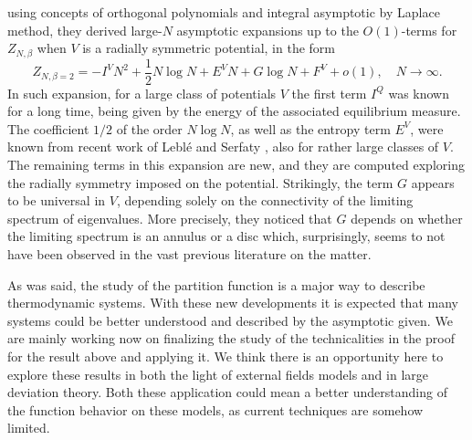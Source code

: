 \documentclass[12pt]{report}
\begin{document}
using concepts of orthogonal polynomials and integral asymptotic by Laplace method, they derived large-$N$ asymptotic expansions up to the $O(1)$-terms for  $Z_{N,\beta}$ when $V$ is a radially symmetric potential, in the form
%
$$
Z_{N,\beta=2}=-I^VN^2+\frac{1}{2}N\log N+E^V N+G\log N+F^V + o(1),\quad N\to \infty.
$$
%
In such expansion, for a large class of potentials $V$ the first term $I^Q$ was known for a long time, being given by the energy of the associated equilibrium measure. The coefficient $1/2$ of the order $N\log N$, as well as the entropy term $E^V$, were known from recent work of Leblé and Serfaty \cite{Leble2017-yj}, also for rather large classes of $V$. The remaining terms in this expansion are new, and they are computed exploring the radially symmetry imposed on the potential. Strikingly, the term $G$ appears to be universal in $V$, depending solely on the connectivity of the limiting spectrum of eigenvalues. More precisely, they noticed that $G$ depends on whether the limiting spectrum is an annulus or a disc which, surprisingly, seems to not have been observed in the vast previous literature on the matter. 

As was said, the study of the partition function is a major way to describe thermodynamic systems. With these new developments it is expected that many systems could be better understood and described by the asymptotic given. We are mainly working now on finalizing the study of the technicalities in the proof for the result above and applying it. We think there is an opportunity here to explore these results in both the light of external fields models and in large deviation theory. Both these application could mean a better understanding of the function behavior on these models, as current techniques are somehow limited.


\end{document}
